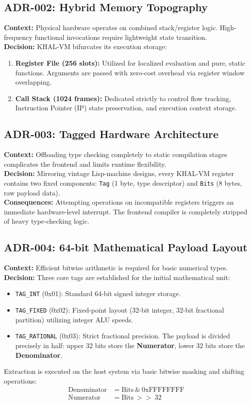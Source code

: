 \documentclass[12pt,a4paper]{article}
\begin{document}
\subsection{ADR-002: Hybrid Memory Topography}
\textbf{Context:} Physical hardware operates on combined stack/register logic. High-frequency functional invocations require lightweight state transition. \\
\textbf{Decision:} KHAL-VM bifurcates its execution storage:
\begin{enumerate}
    \item \textbf{Register File (256 slots):} Utilized for localized evaluation and pure, static functions. Arguments are passed with zero-cost overhead via register window overlapping.
    \item \textbf{Call Stack (1024 frames):} Dedicated strictly to control flow tracking, Instruction Pointer (IP) state preservation, and execution context storage.
\end{enumerate}

\subsection{ADR-003: Tagged Hardware Architecture}
\textbf{Context:} Offloading type checking completely to static compilation stages complicates the frontend and limits runtime flexibility. \\
\textbf{Decision:} Mirroring vintage Lisp-machine designs, every KHAL-VM register contains two fixed components: \texttt{Tag} (1 byte, type descriptor) and \texttt{Bits} (8 bytes, raw payload data). \\
\textbf{Consequences:} Attempting operations on incompatible registers triggers an immediate hardware-level interrupt. The frontend compiler is completely stripped of heavy type-checking logic.

\subsection{ADR-004: 64-bit Mathematical Payload Layout}
\textbf{Context:} Efficient bitwise arithmetic is required for basic numerical types. \\
\textbf{Decision:} Three core tags are established for the initial mathematical unit:
\begin{itemize}
    \item \texttt{TAG\_INT} (0x01): Standard 64-bit signed integer storage.
    \item \texttt{TAG\_FIXED} (0x02): Fixed-point layout (32-bit integer, 32-bit fractional partition) utilizing integer ALU speeds.
    \item \texttt{TAG\_RATIONAL} (0x03): Strict fractional precision. The payload is divided precisely in half: upper 32 bits store the \textbf{Numerator}, lower 32 bits store the \textbf{Denominator}. 
\end{itemize}
Extraction is executed on the host system via basic bitwise masking and shifting operations:
\begin{align}
    \text{Denominator} &= \text{Bits} \ \& \ \text{0xFFFFFFFF} \\
    \text{Numerator} &= \text{Bits} \ >> \ 32
\end{align}
\end{document}
